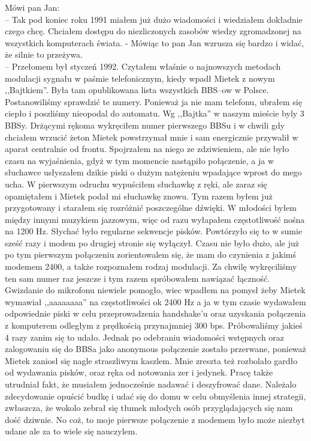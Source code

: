 \documentclass[a4paper,polish,titlepage,12pt]{article}
\begin{document}
Mówi pan Jan:\\
-- Tak pod koniec roku 1991 miałem już dużo wiadomości i wiedziałem dokładnie czego chcę. Chciałem dostępu do niezliczonych zasobów wiedzy zgromadzonej na wszystkich
komputerach świata. - Mówiąc to pan Jan wzrusza się bardzo i widać, że silnie to przeżywa.\\
-- Przełomem był styczeń 1992. Czytałem właśnie o najnowszych metodach modulacji sygnału w paśmie telefonicznym, kiedy wpadł Mietek z nowym ,,Bajtkiem''. Była tam
opublikowana lista wszystkich BBS--ow w Polsce. Postanowiliśmy sprawdzić te numery. Ponieważ ja nie mam telefonu, ubrałem się ciepło i poszliśmy nieopodal do automatu.
Wg ,,Bajtka'' w naszym mieście byly 3 BBSy. Drżącymi rękoma wykręciłem numer pierwszego BBSu i w chwili gdy chciałem wrzucić żeton Mietek powstrzymał mnie i sam energicznie
przywalił w aparat centralnie od frontu. Spojrzałem na niego ze zdziwieniem, ale nie było czasu na wyjaśnienia, gdyż w tym momencie nastąpiło połączenie, a ja w słuchawce
usłyszałem dzikie piski o dużym natężeniu wpadające wprost do mego ucha. W pierwszym odruchu wypuściłem słuchawkę z ręki, ale zaraz się opamiętałem i Mietek podał mi słuchawkę
 znowu. Tym razem byłem już przygotowany i starałem się rozróżnić poszczególne dźwięki. W młodości byłem między innymi muzykiem jazzowym, więc od razu wyłapałem częstotliwość
nośna na 1200 Hz. Słychać było regularne sekwencje pisków. Powtórzyło się to w sumie sześć razy i modem po drugiej stronie się wyłączył. Czasu nie było dużo, ale już po tym
pierwszym połączeniu zorientowalem się, że mam do czynienia z jakimś modemem 2400, a także rozpoznałem rodzaj modulacji. Za chwilę wykręciliśmy ten sam numer raz jeszcze i
tym razem spróbowałem nawiązać łączność. Gwizdanie do mikrofonu niewiele pomogło, wiec wpadłem na pomysł żeby Mietek wymawiał ,,aaaaaaaa'' na częstotliwości ok 2400 Hz a ja w
tym czasie wydawałem odpowiednie piski w celu przeprowadzenia handshake'u oraz uzyskania połączenia z komputerem odległym z prędkością przynajmniej 300 bps. Próbowaliśmy
jakieś 4 razy zanim się to udało. Jednak po odebraniu wiadomości wstępnych oraz zalogowaniu się do BBSa jako anonymous połączenie zostało przerwane, ponieważ Mietek zaniosł
się nagle straszliwym kaszlem. Mnie zreszta też rozbolało gardło od wydawania pisków, oraz ręka od notowania zer i jedynek. Pracę także utrudniał fakt, że musiałem
jednocześnie nadawać i deszyfrować dane. Należalo zdecydowanie opuścić budkę i udać się do domu w celu obmyślenia innej strategii, zwłaszcza, że wokolo zebrał się tłumek
młodych osób przyglądających się nam dość dziwnie. No coż, to moje pierwsze połączenie z modemem było może niezbyt udane ale za to wiele się nauczylem.
\end{document}
